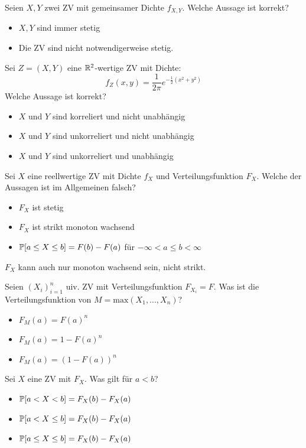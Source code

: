 \hrulefill

Seien $X,Y$ zwei ZV mit gemeinsamer Dichte $f_{X,Y}$. Welche Aussage ist korrekt?
\begin{itemize}
	\item[\marked] $X,Y$ sind immer stetig
	\item[$\square$] Die ZV sind nicht notwendigerweise stetig.
\end{itemize}

\hrulefill

Sei $Z = (X,Y)$ eine $\mathbb{R}^2$-wertige ZV mit Dichte:
$$f_Z(x,y) = \frac{1}{2 \pi} e^{-\frac{1}{2}(x^2 + y^2)}$$
Welche Aussage ist korrekt?
\begin{itemize}
	\item[$\square$] $X$ und $Y$ sind korreliert und nicht unabhängig
	\item[$\square$] $X$ und $Y$ sind unkorreliert und nicht unabhängig
	\item[\marked] $X$ und $Y$ sind unkorreliert und unabhängig
\end{itemize}

\hrulefill

Sei $X$ eine reellwertige ZV mit Dichte $f_X$ und Verteilungsfunktion $F_X$. Welche der Aussagen ist im Allgemeinen falsch?
\begin{itemize}
	\item[$\square$] $F_X$ ist stetig
	\item[\marked] $F_X$ ist strikt monoton wachsend
	\item[$\square$] $\mathbb{P}[a \leq X \leq b] = F(b) - F(a)$ für $- \infty < a \leq b < \infty$
\end{itemize}
$F_X$ kann auch nur monoton wachsend sein, nicht strikt.

\hrulefill

Seien $(X_i)_{i = 1}^n$ uiv. ZV mit Verteilungsfunktion $F_{X_i} = F$. Was ist die Verteilungsfunktion von $M = \text{max}(X_1,...,X_n)$?
\begin{itemize}
	\item[\marked] $F_M(a) = F(a)^n$
	\item[$\square$] $F_M(a) = 1 - F(a)^n$
	\item[$\square$] $F_M(a) = (1 - F(a))^n$
\end{itemize}

\hrulefill

Sei $X$ eine ZV mit $F_X$. Was gilt für $a < b$?
\begin{itemize}
	\item[$\square$] $\mathbb{P}[a < X < b] = F_X(b) - F_X(a)$
	\item[\marked] $\mathbb{P}[a < X \leq b] = F_X(b) - F_X(a)$
	\item[$\square$] $\mathbb{P}[a \leq X \leq b] = F_X(b) - F_X(a)$
\end{itemize}


